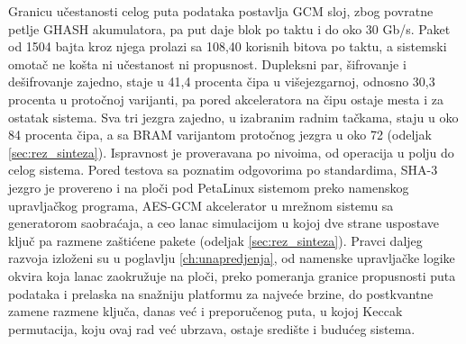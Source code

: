 \smallbreak
Granicu učestanosti celog puta podataka postavlja GCM sloj, zbog povratne petlje GHASH akumulatora, pa put daje blok po taktu i do oko 30 Gb/s. Paket od 1504 bajta kroz njega prolazi sa 108,40 korisnih bitova po taktu, a sistemski omotač ne košta ni učestanost ni propusnost. Dupleksni par, šifrovanje i dešifrovanje zajedno, staje u 41,4 procenta čipa u višejezgarnoj, odnosno 30,3 procenta u protočnoj varijanti, pa pored akceleratora na čipu ostaje mesta i za ostatak sistema. Sva tri jezgra zajedno, u izabranim radnim tačkama, staju u oko 84 procenta čipa, a sa BRAM varijantom protočnog jezgra u oko 72 (odeljak \ref{sec:rez_sinteza}).
\smallbreak
Ispravnost je proveravana po nivoima, od operacija u polju do celog sistema. Pored testova sa poznatim odgovorima po standardima, SHA-3 jezgro je provereno i na ploči pod PetaLinux sistemom preko namenskog upravljačkog programa, AES-GCM akcelerator u mrežnom sistemu sa generatorom saobraćaja, a ceo lanac simulacijom u kojoj dve strane uspostave ključ pa razmene zaštićene pakete (odeljak \ref{sec:rez_sinteza}).
\smallbreak
Pravci daljeg razvoja izloženi su u poglavlju \ref{ch:unapredjenja}, od namenske upravljačke logike okvira koja lanac zaokružuje na ploči, preko pomeranja granice propusnosti puta podataka i prelaska na snažniju platformu za najveće brzine, do postkvantne zamene razmene ključa, danas već i preporučenog puta, u kojoj Keccak permutacija, koju ovaj rad već ubrzava, ostaje središte i budućeg sistema.
